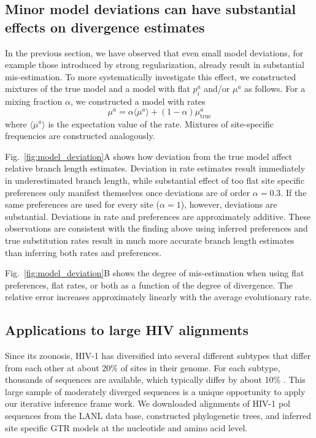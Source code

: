 \documentclass[aps,rmp,twocolumn]{revtex4}
\newcommand{\eqp}{p}
\begin{document}
\subsection*{Minor model deviations can have substantial effects on divergence estimates}
In the previous section, we have observed that even small model deviations, for example those introduced by strong regularization, already result in substantial mis-estimation.
To more systematically investigate this effect, we constructed mixtures of the true model and a model with flat $\eqp_i^a$ and/or $\mu^a$ as follows.
For a mixing fraction $\alpha$, we constructed a model with rates
\begin{equation}
	\mu^a = \alpha \langle \mu^a\rangle + (1-\alpha) \mu^a_{\mathrm{true}}
\end{equation}
where $\langle \mu^a\rangle$ is the expectation value of the rate.
Mixtures of site-specific frequencies are constructed analogously.

Fig.~\ref{fig:model_deviation}A shows how deviation from the true model affect relative branch length estimates.
Deviation in rate estimates result immediately in underestimated branch length, while substantial effect of too flat site specific preferences only manifest themselves once deviations are of order $\alpha = 0.3$.
If the same preferences are used for every site ($\alpha=1$), however, deviations are substantial.
Deviations in rate and preferences are approximately additive.
These observations are consistent with the finding above using inferred preferences and true substitution rates result in much more accurate branch length estimates than inferring both rates and preferences.

Fig.~\ref{fig:model_deviation}B shows the degree of mis-estimation when using flat preferences, flat rates, or both as a function of the degree of divergence.
The relative error increases approximately linearly with the average evolutionary rate.


\subsection*{Applications to large HIV alignments}
Since its zoonosis, HIV-1 has diversified into several different subtypes that differ from each other at about 20\% of sites in their genome.
For each subtype, thousands of sequences are available, which typically differ by about 10\% \citep{LANL}.
This large sample of moderately diverged sequences is a unique opportunity to apply our iterative inference frame work.
We downloaded alignments of HIV-1 pol sequences from the LANL data base, constructed phylogenetic trees, and inferred site specific GTR models at the nucleotide and amino acid level.
\end{document}
